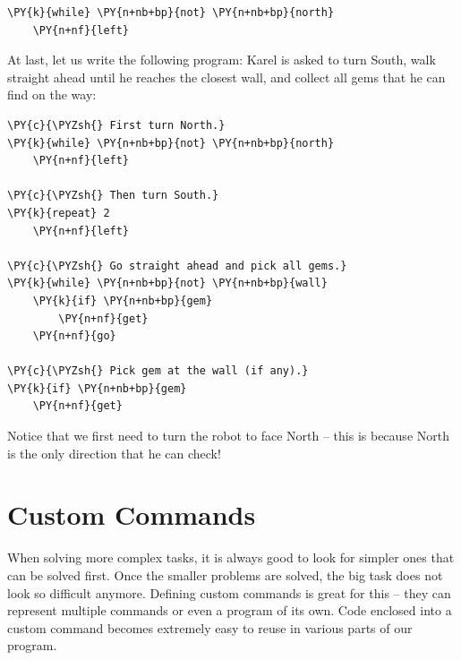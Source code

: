 \begin{bbox}
\begin{Verbatim}[commandchars=\\\{\}]
\PY{k}{while} \PY{n+nb+bp}{not} \PY{n+nb+bp}{north}
    \PY{n+nf}{left}
\end{Verbatim}
\end{bbox}
\vspace{6mm}

\noindent
At last, let us write the following program: Karel is asked to 
turn South, walk straight ahead until he reaches the closest wall, and 
collect all gems that he can find on the way:

\begin{bbox}
\begin{Verbatim}[commandchars=\\\{\}]
\PY{c}{\PYZsh{} First turn North.}
\PY{k}{while} \PY{n+nb+bp}{not} \PY{n+nb+bp}{north}
    \PY{n+nf}{left}

\PY{c}{\PYZsh{} Then turn South.}
\PY{k}{repeat} 2
    \PY{n+nf}{left}

\PY{c}{\PYZsh{} Go straight ahead and pick all gems.}
\PY{k}{while} \PY{n+nb+bp}{not} \PY{n+nb+bp}{wall}
    \PY{k}{if} \PY{n+nb+bp}{gem}
        \PY{n+nf}{get}
    \PY{n+nf}{go}

\PY{c}{\PYZsh{} Pick gem at the wall (if any).}
\PY{k}{if} \PY{n+nb+bp}{gem}
    \PY{n+nf}{get}
\end{Verbatim}
\end{bbox}
\vspace{6mm}

\noindent
Notice that we first need to turn the robot to face North -- this is because North 
is the only direction that he can check!



\section{Custom Commands} \label{sec:newcom}

When solving more complex tasks, it is always good to look for simpler ones that can be solved 
first. Once the smaller problems are solved, the big task does not look so difficult 
anymore. Defining custom commands is great for this -- they can represent multiple commands or 
even a program of its own. Code enclosed into a custom command becomes extremely easy to reuse 
in various parts of our program.

